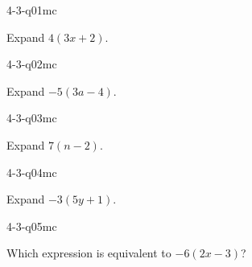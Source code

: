 

\begin{practiceQuestion}{4-3-q01}{mc}
\begin{questionText}
Expand $4(3x + 2)$.
\end{questionText}
\end{practiceQuestion}

\begin{practiceQuestion}{4-3-q02}{mc}
\begin{questionText}
Expand $-5(3a - 4)$.
\end{questionText}
\end{practiceQuestion}

\begin{practiceQuestion}{4-3-q03}{mc}
\begin{questionText}
Expand $7(n - 2)$.
\end{questionText}
\end{practiceQuestion}

\begin{practiceQuestion}{4-3-q04}{mc}
\begin{questionText}
Expand $-3(5y + 1)$.
\end{questionText}
\end{practiceQuestion}

\begin{practiceQuestion}{4-3-q05}{mc}
\begin{questionText}
Which expression is equivalent to $-6(2x - 3)$?
\end{questionText}
\end{practiceQuestion}

